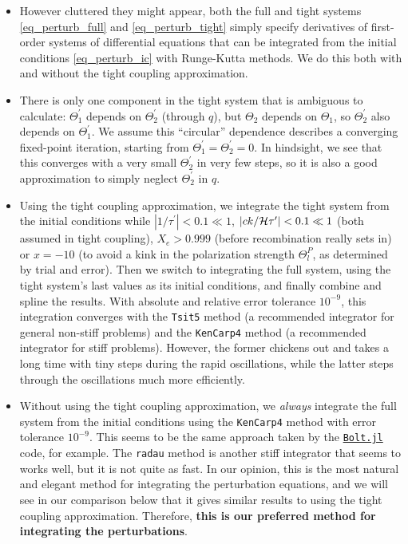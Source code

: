 \documentclass[10pt,a4paper]{article}
\begin{document}
\begin{itemize}
\item
However cluttered they might appear,
both the full and tight systems \eqref{eq_perturb_full} and \eqref{eq_perturb_tight} simply specify derivatives of first-order systems of differential equations
that can be integrated from the initial conditions \eqref{eq_perturb_ic} with Runge-Kutta methods.
We do this both with and without the tight coupling approximation.

\item
There is only one component in the tight system that is ambiguous to calculate:
$\Theta_1^\prime$ depends on $\Theta_2^\prime$ (through $q$),
but $\Theta_2$ depends on $\Theta_1$,
so $\Theta_2^\prime$ also depends on $\Theta_1^\prime$.
We assume this ``circular'' dependence describes a converging fixed-point iteration, starting from $\Theta_1^\prime=\Theta_2^\prime=0$.
In hindsight, we see that this converges with a very small $\Theta_2^\prime$ in very few steps,
so it is also a good approximation to simply neglect $\Theta_2^\prime$ in $q$.

\item
Using the tight coupling approximation,
we integrate the tight system from the initial conditions while
$|1/\tau^\prime| < 0.1 \ll 1$,
$|ck/\mathcal{H}\tau^\prime| < 0.1 \ll 1$ (both assumed in tight coupling),
$X_e > 0.999$ (before recombination really sets in)
or $x = -10$ (to avoid a kink in the polarization strength $\Theta^P_l$, as determined by trial and error).
Then we switch to integrating the full system, using the tight system's last values as its initial conditions, and finally combine and spline the results.
With absolute and relative error tolerance $10^{-9}$,
this integration converges with the \texttt{Tsit5} method (a recommended integrator for general non-stiff problems)
and the \texttt{KenCarp4} method (a recommended integrator for stiff problems).
However, the former chickens out and takes a long time with tiny steps during the rapid oscillations,
while the latter steps through the oscillations much more efficiently.

\item
Without using the tight coupling approximation,
we \textit{always} integrate the full system from the initial conditions using the \texttt{KenCarp4} method with error tolerance $10^{-9}$.
This seems to be the same approach taken by the \texttt{\href{https://github.com/xzackli/Bolt.jl}{Bolt.jl}} code, for example.
The \texttt{radau} method is another stiff integrator that seems to works well, but it is not quite as fast.
In our opinion, this is the most natural and elegant method for integrating the perturbation equations,
and we will see in our comparison below that it gives similar results to using the tight coupling approximation.
Therefore, \textbf{this is our preferred method for integrating the perturbations}.


\end{itemize}
\end{document}
